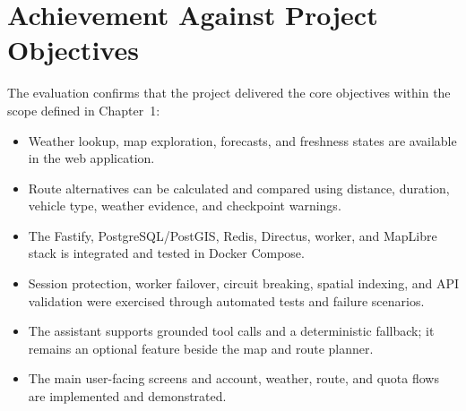 \section{Achievement Against Project Objectives}
The evaluation confirms that the project delivered the core objectives within the scope defined in Chapter~1:
\begin{itemize}
    \item Weather lookup, map exploration, forecasts, and freshness states are available in the web application.
    \item Route alternatives can be calculated and compared using distance, duration, vehicle type, weather evidence, and checkpoint warnings.
    \item The Fastify, PostgreSQL/PostGIS, Redis, Directus, worker, and MapLibre stack is integrated and tested in Docker Compose.
    \item Session protection, worker failover, circuit breaking, spatial indexing, and API validation were exercised through automated tests and failure scenarios.
    \item The assistant supports grounded tool calls and a deterministic fallback; it remains an optional feature beside the map and route planner.
    \item The main user-facing screens and account, weather, route, and quota flows are implemented and demonstrated.
\end{itemize}


